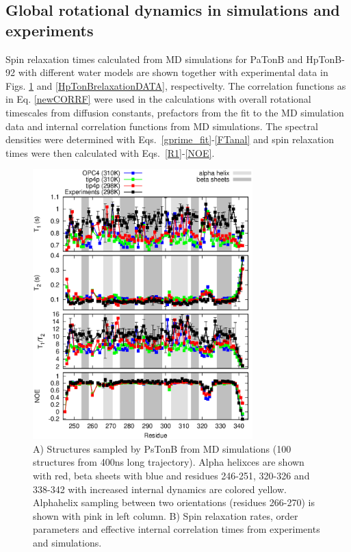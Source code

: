 \documentclass[pre,aps,floatfix,authordate1-4,twocolumn]{revtex4-1}
\begin{document}
\subsection{Global rotational dynamics in simulations and experiments}
Spin relaxation times calculated from MD simulations for PaTonB and HpTonB-92
with different water models are shown together with experimental data \cite{??}
in Figs. \ref{PsTonBrelaxationDATA} and \ref{HpTonBrelaxationDATA}, respectivelty. 
The correlation functions as in Eq. \ref{newCORRF} were used in the calculations
with overall rotational timescales from diffusion constants, prefactors from the fit to the MD simulation data
and internal correlation functions from MD simulations.
The spectral densities were determined with Eqs.~\ref{gprime_fit}-\ref{FTanal} and
spin relaxation times were then calculated with Eqs.~\ref{R1}-\ref{NOE}.
\begin{figure}[!h]
  \includegraphics[width=8.5cm]{../Figs/PsTonBrelaxationDATA.eps}%
  \caption{A) Structures sampled by PsTonB from MD simulations
    (100 structures from 400ns long trajectory). Alpha helixces are
    shown with red, beta sheets with blue and residues 246-251, 320-326 and 338-342
    with increased internal dynamics are colored yellow.
    Alphahelix sampling between two orientations (residues 266-270) is shown with pink in left column.
    B) Spin relaxation rates, order parameters and effective internal correlation
    times from experiments and simulations.\label{PsTonBrelaxationDATA}}%
\end{figure}
\end{document}
